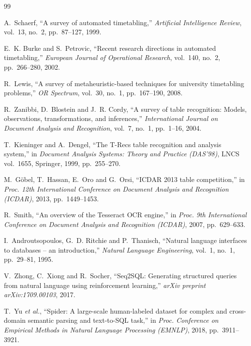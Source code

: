 \begin{thebibliography}{99}

A.~Schaerf, ``A survey of automated timetabling,'' \emph{Artificial Intelligence Review}, vol.~13,
no.~2, pp.~87--127, 1999.

E.~K. Burke and S.~Petrovic, ``Recent research directions in automated timetabling,''
\emph{European Journal of Operational Research}, vol.~140, no.~2, pp.~266--280, 2002.

R.~Lewis, ``A survey of metaheuristic-based techniques for university timetabling problems,''
\emph{OR Spectrum}, vol.~30, no.~1, pp.~167--190, 2008.

R.~Zanibbi, D.~Blostein and J.~R. Cordy, ``A survey of table recognition: Models, observations,
transformations, and inferences,'' \emph{International Journal on Document Analysis and Recognition},
vol.~7, no.~1, pp.~1--16, 2004.

T.~Kieninger and A.~Dengel, ``The T-Recs table recognition and analysis system,'' in
\emph{Document Analysis Systems: Theory and Practice (DAS'98)}, LNCS vol.~1655, Springer, 1999,
pp.~255--270.

M.~G\"obel, T.~Hassan, E.~Oro and G.~Orsi, ``ICDAR 2013 table competition,'' in \emph{Proc. 12th
International Conference on Document Analysis and Recognition (ICDAR)}, 2013, pp.~1449--1453.

R.~Smith, ``An overview of the Tesseract OCR engine,'' in \emph{Proc. 9th International Conference on
Document Analysis and Recognition (ICDAR)}, 2007, pp.~629--633.

I.~Androutsopoulos, G.~D. Ritchie and P.~Thanisch, ``Natural language interfaces to databases --
an introduction,'' \emph{Natural Language Engineering}, vol.~1, no.~1, pp.~29--81, 1995.

V.~Zhong, C.~Xiong and R.~Socher, ``Seq2SQL: Generating structured queries from natural language
using reinforcement learning,'' \emph{arXiv preprint arXiv:1709.00103}, 2017.

T.~Yu \emph{et al.}, ``Spider: A large-scale human-labeled dataset for complex and cross-domain
semantic parsing and text-to-SQL task,'' in \emph{Proc. Conference on Empirical Methods in Natural
Language Processing (EMNLP)}, 2018, pp.~3911--3921.


\end{thebibliography}
